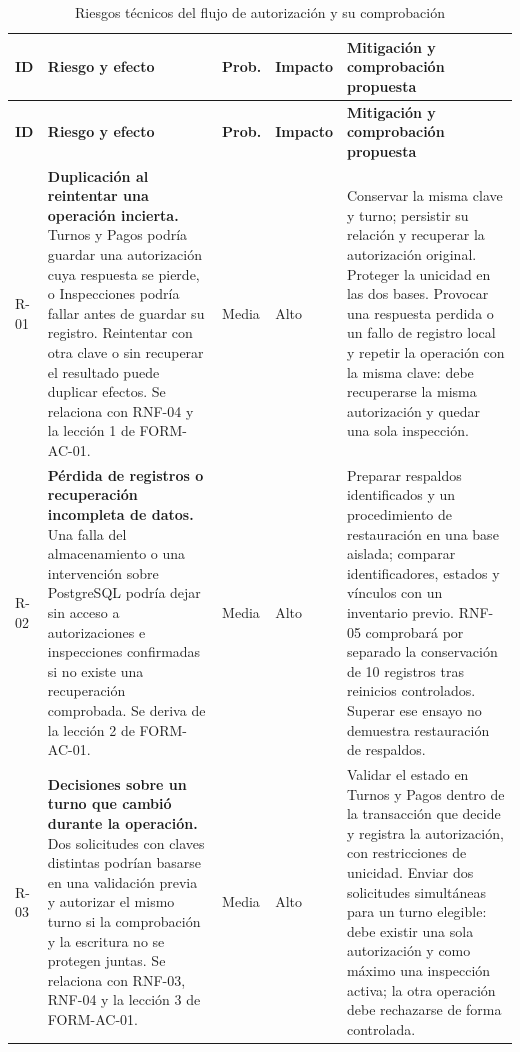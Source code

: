 \documentclass[11pt,a4paper]{article}
\begin{document}
	\begin{xltabular}{\textwidth}{lXL{1.1cm}L{1.6cm}L{5cm}}
		\caption{Riesgos técnicos del flujo de autorización y su comprobación}\label{tab:riesgos}\\
		\toprule
		\textbf{ID} & \textbf{Riesgo y efecto} & \textbf{Prob.} & \textbf{Impacto} & \textbf{Mitigación y comprobación propuesta} \\
		\midrule
		\endfirsthead
		\toprule
		\textbf{ID} & \textbf{Riesgo y efecto} & \textbf{Prob.} & \textbf{Impacto} & \textbf{Mitigación y comprobación propuesta} \\
		\midrule
		\endhead
		\bottomrule
		\endfoot
		R-01 & \textbf{Duplicación al reintentar una operación incierta.} Turnos y Pagos podría guardar una autorización cuya respuesta se pierde, o Inspecciones podría fallar antes de guardar su registro. Reintentar con otra clave o sin recuperar el resultado puede duplicar efectos. Se relaciona con RNF-04 y la lección 1 de FORM-AC-01. & Media & Alto & Conservar la misma clave y turno; persistir su relación y recuperar la autorización original. Proteger la unicidad en las dos bases. Provocar una respuesta perdida o un fallo de registro local y repetir la operación con la misma clave: debe recuperarse la misma autorización y quedar una sola inspección. \\
		R-02 & \textbf{Pérdida de registros o recuperación incompleta de datos.} Una falla del almacenamiento o una intervención sobre PostgreSQL podría dejar sin acceso a autorizaciones e inspecciones confirmadas si no existe una recuperación comprobada. Se deriva de la lección 2 de FORM-AC-01. & Media & Alto & Preparar respaldos identificados y un procedimiento de restauración en una base aislada; comparar identificadores, estados y vínculos con un inventario previo. RNF-05 comprobará por separado la conservación de 10 registros tras reinicios controlados. Superar ese ensayo no demuestra restauración de respaldos. \\
		R-03 & \textbf{Decisiones sobre un turno que cambió durante la operación.} Dos solicitudes con claves distintas podrían basarse en una validación previa y autorizar el mismo turno si la comprobación y la escritura no se protegen juntas. Se relaciona con RNF-03, RNF-04 y la lección 3 de FORM-AC-01. & Media & Alto & Validar el estado en Turnos y Pagos dentro de la transacción que decide y registra la autorización, con restricciones de unicidad. Enviar dos solicitudes simultáneas para un turno elegible: debe existir una sola autorización y como máximo una inspección activa; la otra operación debe rechazarse de forma controlada. \\

\end{xltabular}
\end{document}

